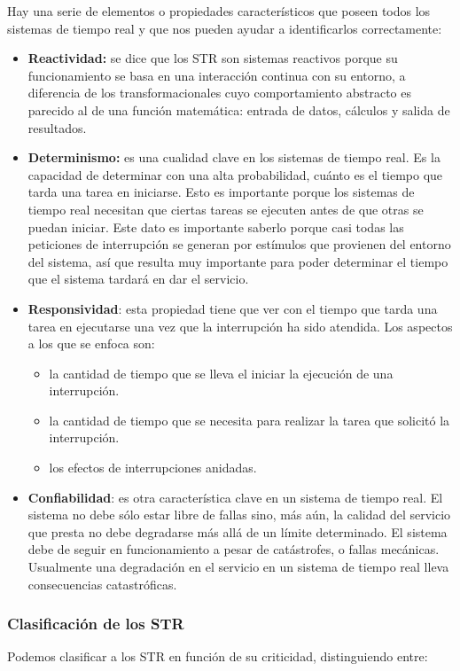 Hay una serie de elementos o propiedades característicos que poseen todos los sistemas de
tiempo real y que nos pueden ayudar a identificarlos correctamente:
\begin{itemize}
    \item \textbf{Reactividad:} se dice que los STR son sistemas reactivos porque su funcionamiento se basa en una interacción continua con su entorno, a diferencia de los transformacionales cuyo comportamiento abstracto es parecido al de una función matemática: entrada de datos, cálculos y salida de resultados.

    \item \textbf{Determinismo:} es una cualidad clave en los sistemas de tiempo real. Es la capacidad de determinar con una alta probabilidad, cuánto es el tiempo que tarda una tarea en iniciarse. Esto es importante porque los sistemas de tiempo real necesitan que ciertas tareas se ejecuten antes de que otras se puedan iniciar. Este dato es importante saberlo porque casi todas las peticiones de interrupción se generan por estímulos que provienen del entorno del sistema, así que resulta muy importante para poder determinar el tiempo que el sistema tardará en dar el servicio.
    \item \textbf{Responsividad}: esta propiedad tiene que ver con el tiempo que tarda una tarea en ejecutarse una vez que la interrupción ha sido atendida. Los aspectos a los que se enfoca son:
        \begin{itemize}
            \item la cantidad de tiempo que se lleva el iniciar la ejecución de una interrupción.
            \item la cantidad de tiempo que se necesita para realizar la tarea que solicitó la interrupción.
            \item los efectos de interrupciones anidadas.
        \end{itemize}
    \item \textbf{Confiabilidad}: es otra característica clave en un sistema de tiempo real. El sistema no debe sólo estar libre de fallas sino, más aún, la calidad del servicio que presta no debe degradarse más allá de un límite determinado. El sistema debe de seguir en funcionamiento a pesar de catástrofes, o fallas mecánicas. Usualmente una degradación en el servicio en un sistema de tiempo real lleva consecuencias catastróficas.
\end{itemize}

\subsubsection{Clasificación de los STR}
Podemos clasificar a los STR en función de su criticidad, distinguiendo entre:


